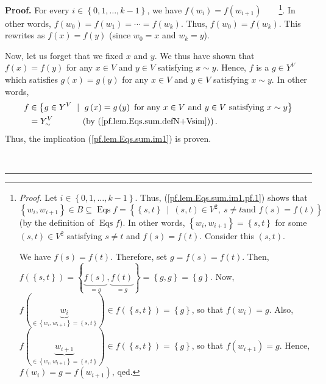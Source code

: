 \documentclass[numbers=enddot,12pt,final,onecolumn,notitlepage]{scrartcl}%
\theoremstyle{definition}
\newenvironment{proof}[1][Proof]{\noindent\textbf{#1.} }{\ \rule{0.5em}{0.5em}}
\newenvironment{verlong}{}{}
\begin{document}
\begin{verlong}
\begin{proof}
For every $i\in\left\{  0,1,\ldots,k-1\right\}  $, we have $f\left(
w_{i}\right)  =f\left(  w_{i+1}\right)  $\ \ \ \ \footnote{\textit{Proof.} Let
$i\in\left\{  0,1,\ldots,k-1\right\}  $. Thus, (\ref{pf.lem.Eqs.sum.im1.pf.1})
shows that
\[
\left\{  w_{i},w_{i+1}\right\}  \in B\subseteq\operatorname*{Eqs}f=\left\{
\left\{  s,t\right\}  \ \mid\ \left(  s,t\right)  \in V^{2},\ s\neq t\text{
and }f\left(  s\right)  =f\left(  t\right)  \right\}
\]
(by the definition of $\operatorname*{Eqs}f$). In other words, $\left\{
w_{i},w_{i+1}\right\}  =\left\{  s,t\right\}  $ for some $\left(  s,t\right)
\in V^{2}$ satisfying $s\neq t$ and $f\left(  s\right)  =f\left(  t\right)  $.
Consider this $\left(  s,t\right)  $.
\par
We have $f\left(  s\right)  =f\left(  t\right)  $. Therefore, set $g=f\left(
s\right)  =f\left(  t\right)  $. Then, $f\left(  \left\{  s,t\right\}
\right)  =\left\{  \underbrace{f\left(  s\right)  }_{=g},\underbrace{f\left(
t\right)  }_{=g}\right\}  =\left\{  g,g\right\}  =\left\{  g\right\}  $. Now,
$f\left(  \underbrace{w_{i}}_{\in\left\{  w_{i},w_{i+1}\right\}  =\left\{
s,t\right\}  }\right)  \in f\left(  \left\{  s,t\right\}  \right)  =\left\{
g\right\}  $, so that $f\left(  w_{i}\right)  =g$. Also, $f\left(
\underbrace{w_{i+1}}_{\in\left\{  w_{i},w_{i+1}\right\}  =\left\{
s,t\right\}  }\right)  \in f\left(  \left\{  s,t\right\}  \right)  =\left\{
g\right\}  $, so that $f\left(  w_{i+1}\right)  =g$. Hence, $f\left(
w_{i}\right)  =g=f\left(  w_{i+1}\right)  $, qed.}. In other words, $f\left(
w_{0}\right)  =f\left(  w_{1}\right)  =\cdots=f\left(  w_{k}\right)  $. Thus,
$f\left(  w_{0}\right)  =f\left(  w_{k}\right)  $. This rewrites as $f\left(
x\right)  =f\left(  y\right)  $ (since $w_{0}=x$ and $w_{k}=y$).

Now, let us forget that we fixed $x$ and $y$. We thus have shown that
$f\left(  x\right)  =f\left(  y\right)  $ for any $x\in V$ and $y\in V$
satisfying $x\sim y$. Hence, $f$ is a $g\in Y^{V}$ which satisfies $g\left(
x\right)  =g\left(  y\right)  $ for any $x\in V$ and $y\in V$ satisfying
$x\sim y$. In other words,%
\begin{align*}
f  &  \in\left\{  g\in Y^{V}\ \mid\ g\left(  x\right)  =g\left(  y\right)
\text{ for any }x\in V\text{ and }y\in V\text{ satisfying }x\sim y\right\} \\
&  =Y_{\sim}^{V}\ \ \ \ \ \ \ \ \ \ \left(  \text{by
(\ref{pf.lem.Eqs.sum.defN+Vsim})}\right)  .
\end{align*}
Thus, the implication (\ref{pf.lem.Eqs.sum.im1}) is proven.


\end{proof}
\end{verlong}
\end{document}
